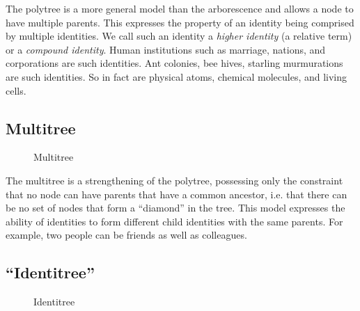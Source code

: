 \documentclass[pra,twocolumn,groupedaddress,10pt]{revtex4}
\theoremstyle{definition}
\begin{document}
The polytree\cite{polytree} is a more general model than the arborescence and allows a node to have multiple parents. This expresses the property of an identity being comprised by multiple identities. We call such an identity a \textit{higher identity} (a relative term) or a \textit{compound identity}. Human institutions such as marriage, nations, and corporations are such identities. Ant colonies, bee hives, starling murmurations are such identities. So in fact are physical atoms, chemical molecules, and living cells.

\subsection{Multitree} \label{sec:multitree}

\begin{figure}[htp]
\centering
{}
\caption{\label{fig:multitree}Multitree}
\end{figure}

The multitree\cite{multitree} is a strengthening of the polytree, possessing only the constraint that no node can have parents that have a common ancestor, i.e. that there can be no set of nodes that form a ``diamond'' in the tree. This model expresses the ability of identities to form different child identities with the same parents. For example, two people can be friends as well as colleagues.

\subsection{``Identitree''} \label{sec:identitree}

\begin{figure}[htp]
\centering
{}
\caption{\label{fig:identitree}Identitree}
\end{figure}
\end{document}
